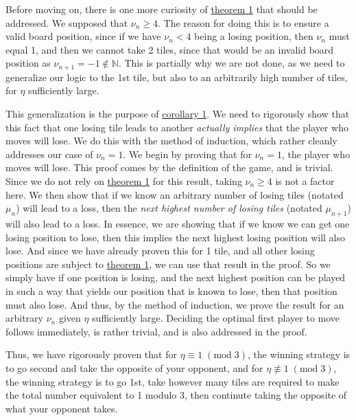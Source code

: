 \documentclass[11pt, letterpaper]{article}
\renewcommand{\mod}[1]{\;(\text{mod}\;#1)}
\begin{document}
Before moving on, there is one more curiosity of \hyperref[lma:1]{theorem 1} that should be addressed. We supposed that $\nu_n \geq 4$. The reason for doing this is to ensure a valid board position, since if we have $\nu_n <4$ being a losing position, then $\nu _n$ must equal 1, and then we cannot take 2 tiles, since that would be an invalid board position as $\nu _{n+1}=-1\notin \mathbb{N}$. This is partially why we are not done, as we need to generalize our logic to the 1st tile, but also to an arbitrarily high number of tiles, for $\eta $ sufficiently large.

This generalization is the purpose of \hyperref[cor:1]{corollary 1}. We need to rigorously show that this fact that one losing tile leads to another \emph{actually implies} that the player who moves will lose. We do this with the method of induction, which rather cleanly addresses our case of $\nu _n = 1$. We begin by proving that for $\nu_n = 1$, the player who moves will lose. This proof comes by the definition of the game, and is trivial. Since we do not rely on \hyperref[lma:1]{theorem 1} for this result, taking $\nu _n \geq 4$ is not a factor here. We then show that if we know an arbitrary number of losing tiles (notated $\mu_n$) will lead to a loss, then the \emph{next highest number of losing tiles} (notated $\mu _{n+1}$) will also lead to a loss. In essence, we are showing that if we know we can get one losing position to lose, then this implies the next highest losing position will also lose. And since we have already proven this for 1 tile, and all other losing positions are subject to \hyperref[lma:1]{theorem 1}, we can use that result in the proof. So we simply have if one position is losing, and the next highest position can be played in such a way that yields our position that is known to lose, then that position must also lose. And thus, by the method of induction, we prove the result for an arbitrary $\nu_n$ given $\eta $ sufficiently large. Deciding the optimal first player to move follows immediately, is rather trivial, and is also addressed in the proof.

Thus, we have rigorously proven that for $\eta \equiv 1\mod{3}$, the winning strategy is to go second and take the opposite of your opponent, and for $\eta \not\equiv1\mod{3} $, the winning strategy is to go 1st, take however many tiles are required to make the total number equivalent to 1 modulo 3, then continute taking the opposite of what your opponent takes.
\end{document}
